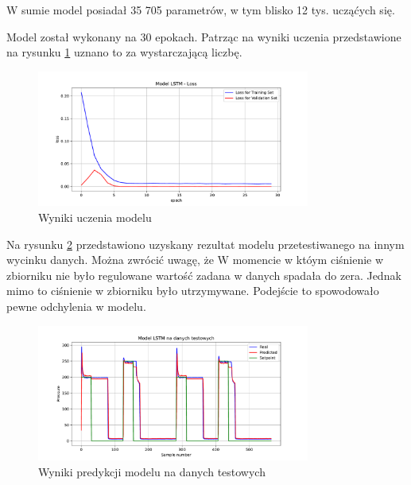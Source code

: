 \documentclass[a4paper,12pt]{article}
\begin{document}
W sumie model posiadał 35 705 parametrów, w tym blisko 12 tys. ucząćych się. 

Model został wykonany na 30 epokach. Patrząc na wyniki uczenia przedstawione na rysunku \ref{fig:model_learning} uznano to za wystarczającą liczbę. 

\begin{figure}[H]
        \centering
        \includegraphics[width=0.8\textwidth]{model_loss.pdf}
        \caption{Wyniki uczenia modelu}
        \label{fig:model_learning}
\end{figure}

Na rysunku \ref{fig:model_predict} przedstawiono uzyskany rezultat modelu przetestiwanego na innym wycinku danych. Można zwrócić uwagę, że W momencie w któym ciśnienie w zbiorniku nie było regulowane wartość zadana w danych spadała do zera. Jednak mimo to ciśnienie w zbiorniku było utrzymywane. Podejście to spowodowało pewne odchylenia w modelu. 

\begin{figure}[H]
        \centering
        \includegraphics[width=0.8\textwidth]{model_learn.pdf}
        \caption{Wyniki predykcji modelu na danych testowych}
        \label{fig:model_predict}
\end{figure}
\end{document}
